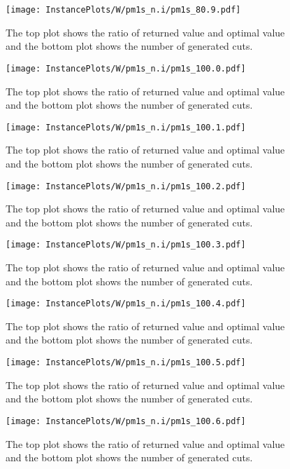 \documentclass[10pt,a4paper]{article}
\begin{document}
\begin{figure}[H]
\texttt{[image: InstancePlots/W/pm1s\_n.i/pm1s\_80.9.pdf]}
\caption{The top plot shows the ratio of returned value and optimal value     and the bottom plot shows the number of generated cuts.}
\end{figure}

\begin{figure}[H]
\texttt{[image: InstancePlots/W/pm1s\_n.i/pm1s\_100.0.pdf]}
\caption{The top plot shows the ratio of returned value and optimal value     and the bottom plot shows the number of generated cuts.}
\end{figure}

\begin{figure}[H]
\texttt{[image: InstancePlots/W/pm1s\_n.i/pm1s\_100.1.pdf]}
\caption{The top plot shows the ratio of returned value and optimal value     and the bottom plot shows the number of generated cuts.}
\end{figure}

\begin{figure}[H]
\texttt{[image: InstancePlots/W/pm1s\_n.i/pm1s\_100.2.pdf]}
\caption{The top plot shows the ratio of returned value and optimal value     and the bottom plot shows the number of generated cuts.}
\end{figure}

\begin{figure}[H]
\texttt{[image: InstancePlots/W/pm1s\_n.i/pm1s\_100.3.pdf]}
\caption{The top plot shows the ratio of returned value and optimal value     and the bottom plot shows the number of generated cuts.}
\end{figure}

\begin{figure}[H]
\texttt{[image: InstancePlots/W/pm1s\_n.i/pm1s\_100.4.pdf]}
\caption{The top plot shows the ratio of returned value and optimal value     and the bottom plot shows the number of generated cuts.}
\end{figure}

\begin{figure}[H]
\texttt{[image: InstancePlots/W/pm1s\_n.i/pm1s\_100.5.pdf]}
\caption{The top plot shows the ratio of returned value and optimal value     and the bottom plot shows the number of generated cuts.}
\end{figure}

\begin{figure}[H]
\texttt{[image: InstancePlots/W/pm1s\_n.i/pm1s\_100.6.pdf]}
\caption{The top plot shows the ratio of returned value and optimal value     and the bottom plot shows the number of generated cuts.}
\end{figure}
\end{document}
